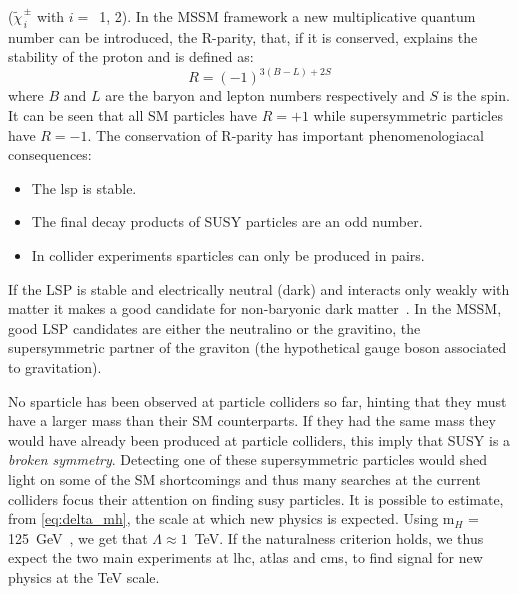 ($\widetilde{\chi}^{\, \pm}_{\, i}$ with $i = $~1, 2). In the MSSM framework a
new multiplicative quantum number can be introduced, the R-parity, that, if it
is conserved, explains the stability of the proton and is defined as:
\begin{equation}
  \label{eq:54}
  R = (-1)^{3(B - L) + 2S}
\end{equation}
where $B$ and $L$ are the baryon and lepton numbers respectively and $S$ is the
spin. It can be seen that all SM particles have $R = + 1$ while supersymmetric
particles have $R = -1$. The conservation of R-parity has important
phenomenologiacal consequences:
\begin{itemize}
\item The \gls{lsp} is stable.
\item The final decay products of SUSY particles are an odd number.
\item In collider experiments sparticles can only be produced in pairs.
\end{itemize}
If the LSP is stable and electrically neutral (dark) and interacts only weakly
with matter it makes a good candidate for non-baryonic dark
matter~\cite{WIMPS}. In the MSSM, good LSP candidates are either the neutralino
or the gravitino, the supersymmetric partner of the graviton (the hypothetical
gauge boson associated to gravitation).

No sparticle has been observed at particle colliders so far, hinting that they
must have a larger mass than their SM counterparts. If they had the same mass
they would have already been produced at particle colliders, this imply that
SUSY is a \emph{broken symmetry}. Detecting one of these supersymmetric
particles would shed light on some of the SM shortcomings and thus many searches
at the current colliders focus their attention on finding \gls{susy}
particles. It is possible to estimate, from \cref{eq:delta_mh}, the scale at
which new physics is expected. Using m$_H$ = 125~GeV~\cite{PDG}, we get that
$\Lambda \approx 1$~TeV. If the naturalness criterion holds, we thus expect the
two main experiments at \gls{lhc}, \gls{atlas} and \gls{cms}, to find signal for
new physics at the TeV scale.
